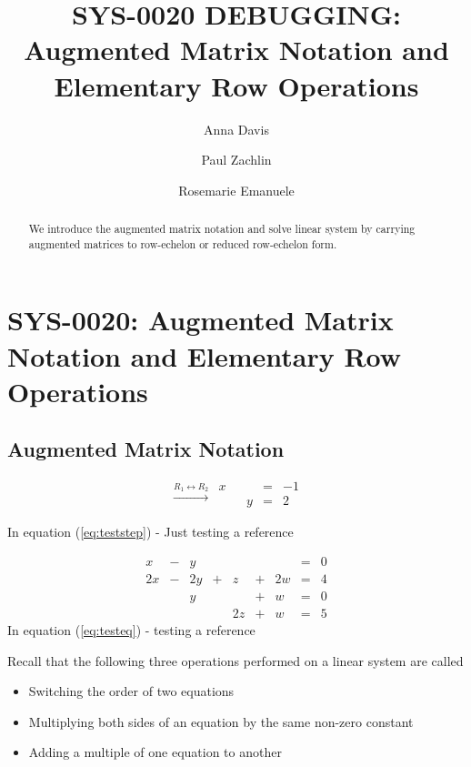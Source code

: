 \documentclass{ximera}
\author{Anna Davis \and Paul Zachlin \and Rosemarie Emanuele} \title{SYS-0020 DEBUGGING:  Augmented Matrix Notation and Elementary Row Operations} \license{CC-BY-NC-SA}
\begin{document}
\begin{abstract}
  We introduce the augmented matrix notation and solve linear system by carrying augmented matrices to row-echelon or reduced row-echelon form.
\end{abstract}
\maketitle

\section*{SYS-0020:  Augmented Matrix Notation and Elementary Row Operations}

\subsection*{Augmented Matrix Notation}

\begin{equation}\label{eq:teststep}
\begin{array}{c}
 \xrightarrow{R_1\leftrightarrow R_2}\\
 \end{array}
\begin{array}{ccccc}
      x & &&= &-1\\
      & &y&=&2      
    \end{array}
\end{equation}  

In equation (\ref{eq:teststep}) - Just testing a reference


\begin{equation}\label{eq:testeq}
\begin{array}{ccccccccc}
      x &- &y&&&&&= &0 \\
	 2x& -&2y&+&z&+&2w&=&4\\
     & &y&&&+&w&=&0\\
     & &&&2z&+&w&=&5
    \end{array}
\end{equation}
In equation (\ref{eq:testeq}) - testing a reference


Recall that the following three operations performed on a linear system are called 
\begin{itemize}
\item Switching the order of two equations
\item Multiplying both sides of an equation by the same non-zero constant
\item Adding a multiple of one equation to another
\end{itemize}
\end{document}
